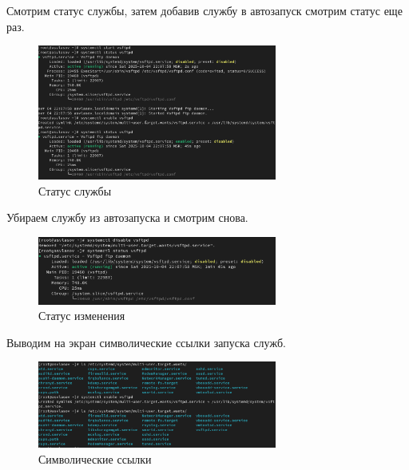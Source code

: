 \documentclass[
  12pt,
  a4paper,
  DIV=11,
  numbers=noendperiod]{scrreprt}
\begin{document}
Смотрим статус службы, затем добавив службу в автозапуск смотрим статус
еще раз.

\begin{figure}

{\centering \includegraphics[width=0.7\textwidth,height=\textheight]{image/2.png}

}

\caption{Статус службы}

\end{figure}%

Убираем службу из автозапуска и смотрим снова.

\begin{figure}

{\centering \includegraphics[width=0.7\textwidth,height=\textheight]{image/3.png}

}

\caption{Статус изменения}

\end{figure}%

Выводим на экран символические ссылки запуска служб.

\begin{figure}

{\centering \includegraphics[width=0.7\textwidth,height=\textheight]{image/4.png}

}

\caption{Символические ссылки}

\end{figure}%
\end{document}
